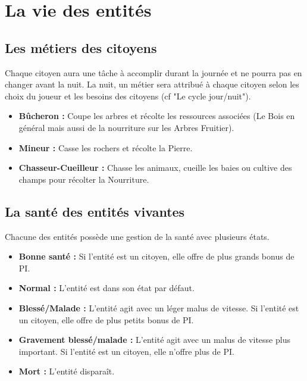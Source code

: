 \documentclass[a4paper]{article}
\begin{document}
    \section{La vie des entités}

      \subsection{Les métiers des citoyens}
        Chaque citoyen aura une tâche à accomplir durant la journée et ne pourra pas en changer avant la nuit. La nuit, un métier sera attribué à chaque citoyen selon les choix du joueur et les besoins des citoyens (cf "Le cycle jour/nuit").
        \begin{itemize}
          \item \textbf{Bûcheron :} \small{ Coupe les arbres et récolte les ressources associées (Le Bois en général mais aussi de la nourriture sur les Arbres Fruitier).}
          \item \textbf{Mineur :} \small{ Casse les rochers et récolte la Pierre.}
          \item \textbf{Chasseur-Cueilleur :} \small{ Chasse les animaux, cueille les baies ou cultive des champs pour récolter la Nourriture.}
        \end{itemize}

      \subsection{La santé des entités vivantes}
        Chacune des entités possède une gestion de la santé avec plusieurs états.
        \begin{itemize}
          \item \textbf{Bonne santé :} \small{ Si l'entité est un citoyen, elle offre de plus grands bonus de PI.}
          \item \textbf{Normal :} \small{ L'entité est dans son état par défaut.}
          \item \textbf{Blessé/Malade :} \small{ L'entité agit avec un léger malus de vitesse. Si l'entité est un citoyen, elle offre de plus petits bonus de PI.}
          \item \textbf{Gravement blessé/malade :} \small{ L'entité agit avec un malus de vitesse plus important. Si l'entité est un citoyen, elle n'offre plus de PI.}
          \item \textbf{Mort :} \small{ L'entité disparaît.}
        \end{itemize}
\end{document}
